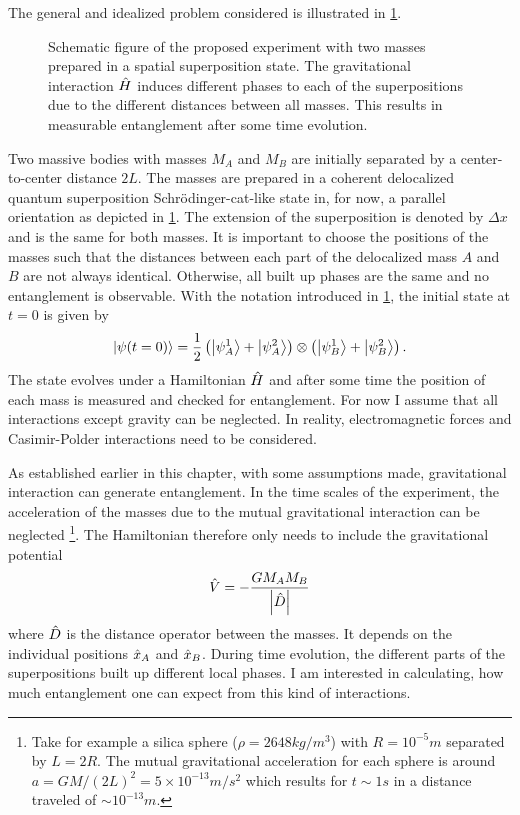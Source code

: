 The general and idealized problem considered is illustrated in \cref{fig:2:simple-problem}.
\begin{figure}[!htbp]
  \centering
  \def\svgwidth{\textwidth}
  
  \caption{Schematic figure of the proposed experiment with two masses prepared in a spatial superposition state. The gravitational interaction $\hat{H}$ induces different phases to each of the superpositions due to the different distances between all masses. This results in measurable entanglement after some time evolution.}
  \label{fig:2:simple-problem}
\end{figure}
Two massive bodies with masses $M_A$ and $M_B$ are initially separated by a center-to-center distance $2L$. The masses are prepared in a coherent delocalized quantum superposition Schrödinger-cat-like state in, for now, a parallel orientation as depicted in \cref{fig:2:simple-problem}.
The extension of the superposition is denoted by $\Delta x$ and is the same for both masses.
It is important to choose the positions of the masses such that the distances between each part of the delocalized mass $A$ and $B$ are not always identical. 
Otherwise, all built up phases are the same and no entanglement is observable.
With the notation introduced in \cref{fig:2:simple-problem}, the initial state at $t=0$ is given by
\begin{equation}\label{eq:2:initial-state}
  \ket{\psi(t=0)} = \frac{1}{2}\left( \ket{\psi_A^1} + \ket{\psi_A^2} \right) \otimes \left( \ket{\psi_B^1} + \ket{\psi_B^2} \right) .
\end{equation}
The state evolves under a Hamiltonian $\hat{H}$ and after some time the position of each mass is measured and checked for entanglement.
For now I assume that all interactions except gravity can be neglected. In reality, electromagnetic forces and Casimir-Polder interactions \cite{Casimir_1948, Casimir_1948a} need to be considered.

As established earlier in this chapter, with some assumptions made, gravitational interaction can generate entanglement. In the time scales of the experiment, the acceleration of the masses due to the mutual gravitational interaction can be neglected \footnote{Take for example a silica sphere ($\rho = 2648 \si{kg/m^3}$) with $R=10^{-5}\si{m}$ separated by $L=2R$. The mutual gravitational acceleration for each sphere is around $a=GM/(2L)^2 = 5 \times 10^{-13}\si{m/s^2}$ which results for $t\sim 1 \si{s}$ in a distance traveled of $\sim 10^{-13}\si{m}$.}. The Hamiltonian therefore only needs to include the gravitational potential 
\begin{equation} \label{eq:2:potential}
  \hat{V} = -\frac{GM_AM_B}{\left\lvert\hat{D}\right\rvert}
\end{equation}
where $\hat{D}$ is the distance operator between the masses. It depends on the individual positions $\hat{x}_A$ and $\hat{x}_B$.
During time evolution, the different parts of the superpositions built up different local phases. I am interested in calculating, how much entanglement one can expect from this kind of interactions.


